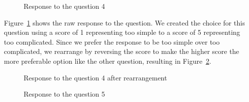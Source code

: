 \documentclass[12pt,oneside,openright,a4paper]{cpe-english-project}
\begin{document}
\begin{figure}[!h]\centering {} \caption{Response to the question 4} \label{fig:usability-test-response-4} \end{figure}
Figure~\ref{fig:usability-test-response-4} shows the raw response to the question. We created the choice for this question using a score of 1 representing too simple to a score of 5 representing too complicated. Since we prefer the response to be too simple over too complicated, we rearrange by reversing the score to make the higher score the more preferable option like the other question, resulting in Figure~\ref{fig:usability-test-response-4-rearranged}.
\begin{figure}[!h]\centering {} \caption{Response to the question 4 after rearrangement} \label{fig:usability-test-response-4-rearranged} \end{figure}
\begin{figure}[!h]\centering {} \caption{Response to the question 5} \end{figure}
\end{document}
